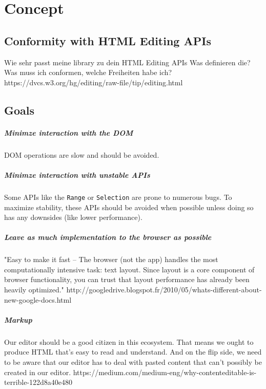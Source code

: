 \chapter{Concept}


\section{Conformity with HTML Editing APIs}
Wie sehr passt meine library zu dein HTML Editing APIs
Was definieren die?
Was muss ich conformen, welche Freiheiten habe ich?
https://dvcs.w3.org/hg/editing/raw-file/tip/editing.html

\section{Goals}

\paragraph{Minimze interaction with the DOM} DOM operations are slow and should be avoided.

\paragraph{Minimze interaction with unstable APIs} Some APIs like the \texttt{Range} or \texttt{Selection} are prone to numerous bugs. To maximize stability, these APIs should be avoided when possible unless doing so has any downsides (like lower performance).

\paragraph{Leave as much implementation to the browser as possible} "Easy to make it fast -- The browser (not the app) handles the most computationally intensive task: text layout. Since layout is a core component of browser functionality, you can trust that layout performance has already been heavily optimized." http://googledrive.blogspot.fr/2010/05/whats-different-about-new-google-docs.html

\paragraph{Markup} Our editor should be a good citizen in this ecosystem. That means we ought to produce HTML that’s easy to read and understand. And on the flip side, we need to be aware that our editor has to deal with pasted content that can’t possibly be created in our editor. https://medium.com/medium-eng/why-contenteditable-is-terrible-122d8a40e480

